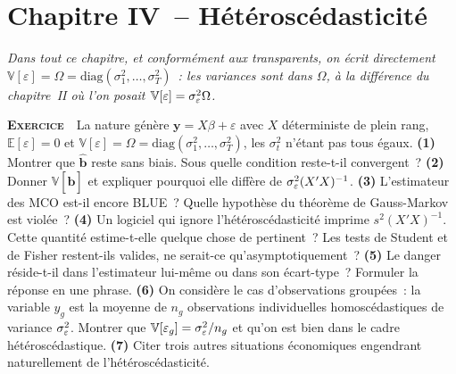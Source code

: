 \documentclass[10pt,a4paper,notitlepage]{article}
\newcounter{xnumber}
\newcommand{\exercice}{\refstepcounter{xnumber}\textsc{\textbf{Exercice}} \textbf{\thexnumber}\,\,}
\newcommand{\question}[1]{\textbf{(#1)}}
\begin{document}
\bigskip

\section*{Chapitre IV~-- Hétéroscédasticité}

\textit{Dans tout ce chapitre, et conformément aux transparents, on écrit
directement $\mathbb V[\varepsilon] = \Omega = \mathrm{diag}(\sigma_1^2,\dots,\sigma_T^2)$~:
les variances sont \emph{dans} $\Omega$, à la différence du chapitre~II où l'on
posait $\mathbb V[\varepsilon] = \sigma_{\varepsilon}^2\Omega$.}

\bigskip

\exercice\label{ex:cout-hetero} La nature génère $\mathbf y = X\beta+\varepsilon$ avec $X$
déterministe de plein rang, $\mathbb E[\varepsilon]=0$ et
$\mathbb V[\varepsilon] = \Omega = \mathrm{diag}(\sigma_1^2,\dots,\sigma_T^2)$,
les $\sigma_t^2$ n'étant pas tous égaux. \question{1} Montrer que
$\hat{\mathbf b}$ reste sans biais. Sous quelle condition reste-t-il
convergent~? \question{2} Donner $\mathbb V[\hat{\mathbf b}]$ et expliquer
pourquoi elle diffère de $\sigma_{\varepsilon}^2(X'X)^{-1}$. \question{3} L'estimateur des MCO
est-il encore BLUE~? Quelle hypothèse du théorème de Gauss-Markov est
violée~? \question{4} Un logiciel qui ignore l'hétéroscédasticité imprime
$s^2(X'X)^{-1}$. Cette quantité estime-t-elle quelque chose de pertinent~? Les
tests de Student et de Fisher restent-ils valides, ne serait-ce
qu'asymptotiquement~? \question{5} Le danger réside-t-il dans l'estimateur
lui-même ou dans son écart-type~? Formuler la réponse en une phrase.
\question{6} On considère le cas d'observations groupées~: la variable
$y_g$ est la moyenne de $n_g$ observations individuelles homoscédastiques de
variance $\sigma_{\varepsilon}^2$. Montrer que $\mathbb V[\varepsilon_g] = \sigma_{\varepsilon}^2/n_g$ et
qu'on est bien dans le cadre hétéroscédastique. \question{7} Citer trois autres
situations économiques engendrant naturellement de l'hétéroscédasticité.\newline

\bigskip
\end{document}
